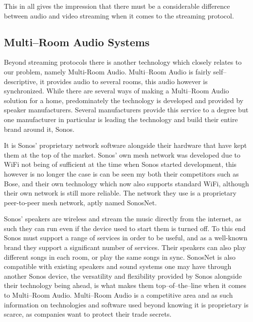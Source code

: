 This in all gives the impression that there must be a considerable difference between audio and video streaming when it comes to the streaming protocol.

\subsection{Multi--Room Audio Systems}
Beyond streaming protocols there is another technology which closely relates to our problem, namely Multi-Room Audio.
Multi--Room Audio is fairly self--descriptive, it provides audio to several rooms, this audio however is synchronized.
While there are several ways of making a Multi--Room Audio solution for a home, predominately the technology is developed and provided by speaker manufacturers.
Several manufacturers provide this service to a degree but one manufacturer in particular is leading the technology and build their entire brand around it, Sonos.

It is Sonos' proprietary network software alongside their hardware that have kept them at the top of the market.
Sonos' own mesh network was developed due to WiFi not being of sufficient at the time when Sonos started development, this however is no longer the case is can be seen my both their competitors such as Bose, and their own technology which now also supports standard WiFi, although their own network is still more reliable.\cite{sonos1} %
The network they use is a proprietary peer-to-peer mesh network, aptly named SonosNet.\cite{sonosWiki} %

Sonos' speakers are wireless and stream the music directly from the internet, as such they can run even if the device used to start them is turned off.
To this end Sonos must support a range of services in order to be useful, and as a well-known brand they support a significant number of services.
Their speakers can also play different songs in each room, or play the same songs in sync.
SonosNet is also compatible with existing speakers and sound systems one may have through another Sonos device, the versatility and flexibility provided by Sonos alongside their technology being ahead, is what makes them top--of--the--line when it comes to Multi--Room Audio.\cite{sonos2}
Multi--Room Audio is a competitive area and as such information on technologies and software used beyond knowing it is proprietary is scarce, as companies want to protect their trade secrets.

